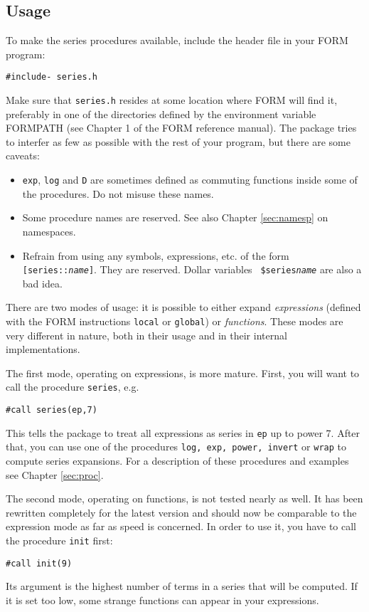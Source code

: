 \documentclass{article}
\begin{document}
\subsection{Usage}
\label{sec:usage}

To make the series procedures available, include the header file in your
FORM program:
\begin{verbatim}
#include- series.h
\end{verbatim}
Make sure that {\tt series.h} resides at some location where FORM will find
it, preferably in one of the directories defined by the environment
variable \mbox{FORMPATH} (see Chapter 1 of the FORM reference manual). The
package tries to interfer as few as possible with the rest of your
program, but there are some caveats:
\begin{itemize}
\item {\tt exp}, {\tt log} and {\tt D} are sometimes defined as commuting
  functions inside some of the procedures. Do not misuse these names.
\item Some procedure names are reserved. See also Chapter
  \ref{sec:namesp} on namespaces.
\item Refrain from  using any symbols, expressions, etc. of the form
  {\tt[series::{\it name}]}. They are reserved. Dollar variables {\tt
    \$series{\it name}} are also a bad idea.
\end{itemize}

There are two modes of usage: it is possible to either expand {\em expressions}
(defined with the FORM instructions {\tt local} or {\tt global}) or {\em
  functions}. These modes are very different in nature, both in their
usage and in their internal implementations. 

The first mode, operating on expressions, is more mature. 
First, you will want to
call the procedure {\tt series}, e.g.
\begin{verbatim}
#call series(ep,7)
\end{verbatim}
This tells the package to treat all expressions as series in {\tt ep} up
to power 7. After that, you can use one of the procedures {\tt log, exp,
  power, invert} or {\tt wrap} to compute series expansions. For a
description of these procedures and examples see Chapter \ref{sec:proc}.

\medskip

The second mode, operating on functions, is not tested nearly as
well. It has been rewritten completely for the latest version and should
now be comparable to the expression mode as far as speed is concerned. 
In order to use it, you have to call the procedure {\tt init} first:
\begin{verbatim}
#call init(9)
\end{verbatim}
Its argument is the highest number of terms in a series that will be
computed. If it is set too low, some strange functions can appear in
your expressions.
\end{document}
